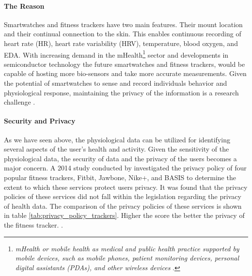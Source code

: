 \paragraph{The Reason} Smartwatches and fitness trackers have two main features. Their mount location and their continual connection to the skin. This enables continuous recording of heart rate (HR), heart rate variability (HRV), temperature, blood oxygen, and EDA. With increasing demand in the mHealth\footnote{\textit{mHealth or mobile
health as medical and public health practice supported by mobile devices, such as mobile phones, patient monitoring devices, personal digital assistants (PDAs), and other wireless devices} \cite{who_global_observatory_for_ehealth_mhealth:_2011}.} sector and developments in semiconductor technology the future smartwatches and fitness trackers, would be capable of hosting more bio-sensors and take more accurate measurements. Given the potential of smartwatches to sense and record individuals behavior and physiological response, maintaining the privacy of the information is a research challenge \cite{rawassizadeh_wearables:_2014}.

\paragraph{Security and Privacy} As we have seen above, the physiological data can be utilized for identifying several aspects of the user's health and activity. Given the sensitivity of the physiological data, the security of data and the privacy of the users becomes a major concern. A 2014 study conducted by \citeauthor{paul2014privacy} investigated the privacy policy of four popular fitness trackers, Fitbit, Jawbone, Nike+, and BASIS to determine the extent to which these services protect users privacy. It was found that the privacy policies of these services did not fall within the legislation regarding the privacy of health data. The comparison of the privacy policies of these services is shown in table \ref{tab:privacy_policy_trackers}. Higher the score the better the privacy of the fitness tracker. \cite{paul2014privacy}.

